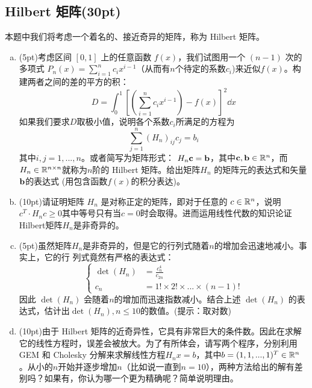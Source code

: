 \documentclass[12pt, a4paper, oneside]{article}
\begin{document}
\subsection{Hilbert 矩阵(30pt)}
本题中我们将考虑一个着名的、接近奇异的矩阵，称为 Hilbert 矩阵。
\begin{enumerate}[(a)]
\item (5pt)考虑区间 $[0,1]$ 上的任意函数 $f(x)$，我们试图用一个 $(n-1)$ 次的多项式 $P_n(x)=\sum_{i=1}^nc_ix^{i-1}$（从而有$n$个待定的系数$c_i$)来近似$f(x)$。构建两者之间的差的平方的积：
\begin{equation}
    D=\int^1_0{[(\sum_{i=1}^nc_ix^{i-1})- f(x)]^2\dd x}
\end{equation}
如果我们要求$D$取极小值，说明各个系数$c_i$所满足的方程为
\begin{equation}
    \sum_{j=1}^n(H_n)_{ij}c_j=b_i
\end{equation}
其中$i,j= 1, ..., n$。或者简写为矩阵形式：
$H_n\textbf{c}=\textbf{b}$，其中$\textbf{c},\textbf{b}\in\mathbb{R}^n$，而$H_n\in\mathbb{R}^{n\times n}$就称为$n$阶的 Hilbert 矩阵。给出矩阵$H_n$ 的矩阵元的表达式和矢量$\textbf{b}$的表达式 (用包含函数$f(x)$的积分表达)。
\item (10pt)请证明矩阵 $H_n$ 是对称正定的矩阵，即对于任意的 $c\in\mathbb{R}^n$，说明
$c^T\cdot H_nc\ge0$其中等号只有当$c=0$时会取得。进而运用线性代数的知识论证 Hilbert矩阵$H_n$是非奇异的。
\item (5pt)虽然矩阵$H_n$是非奇异的，但是它的行列式随着$n$的增加会迅速地减小。事实上，它的行
列式竟然有严格的表达式：
\begin{equation}\left\{
    \begin{aligned}
        \det(H_n)&=\frac{c_n^4}{c_{2n}}\\
        c_n&=1!\times 2! \times ... \times (n-1)!
    \end{aligned}\right.
\end{equation}
因此 $\det(H_n)$ 会随着$n$的增加而迅速指数减小。结合上述 $\det(H_n)$ 的表达式，估计出$\det(H_n), n\le 10$的数值。(提示：取对数)
\item (10pt)由于 Hilbert 矩阵的近奇异性，它具有非常巨大的条件数。因此在求解它的线性方程时，误差会被放大。为了有所体会，请写两个程序，分别利用 GEM 和 Cholesky 分解来求解线性方程$H_nx=b$，其中$b=(1,1,...,1)^T\in \mathbb{R}^n$。从小的$n$开始并逐步增加$n$（比如说一直到$n=10$），两种方法给出的解有差别吗？如果有，你认为哪一个更为精确呢？简单说明理由。
\end{enumerate}
\end{document}
